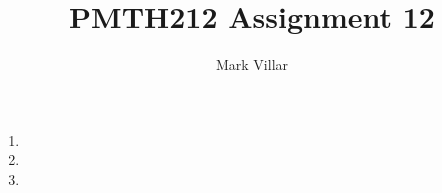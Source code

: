 \documentclass[12pt]{amsart}
\title{PMTH212 Assignment 12}
\author{Mark Villar}
\begin{document}
 

\maketitle 

\begin{enumerate}
	
	\item
		
	\item
							
	\item 
	
\end{enumerate}
\end{document}
